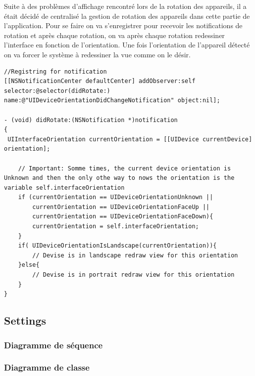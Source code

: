 		Suite à des problèmes d'affichage rencontré lors de la rotation des appareils, il a était décidé de centralisé la gestion de rotation des appareils dans cette partie de l'application. Pour se faire on va s'enregistrer pour recevoir les notifications de rotation et après chaque rotation, on va après chaque rotation redessiner l'interface en fonction de l'orientation. Une fois l'orientation de l'appareil détecté on va forcer le système à redessiner la vue comme on le désir. 
		
			\lstset{
			    style = Xcode,
			    caption=Code d'enregistrement pour la notification de rotation des appareils.,
			    breaklines=true,
			    frame=single
			}
		
			\begin{lstlisting}[name=Orientation did change notification  , label=SampleCode]
		//Registring for notification
[[NSNotificationCenter defaultCenter] addObserver:self selector:@selector(didRotate:) name:@"UIDeviceOrientationDidChangeNotification" object:nil];

- (void) didRotate:(NSNotification *)notification
{	
 UIInterfaceOrientation currentOrientation = [[UIDevice currentDevice] orientation];
    
    // Important: Somme times, the current device orientation is Unknown and then the only othe way to nows the orientation is the variable self.interfaceOrientation
    if (currentOrientation == UIDeviceOrientationUnknown ||
		currentOrientation == UIDeviceOrientationFaceUp ||
		currentOrientation == UIDeviceOrientationFaceDown){
		currentOrientation = self.interfaceOrientation;
    }
    if( UIDeviceOrientationIsLandscape(currentOrientation)){
		// Devise is in landscape redraw view for this orientation
	}else{
		// Devise is in portrait redraw view for this orientation
	}
}
		\end{lstlisting}
	\subsection{Settings}
		\subsubsection*{Diagramme de séquence}
			
		\subsubsection*{Diagramme de classe}
